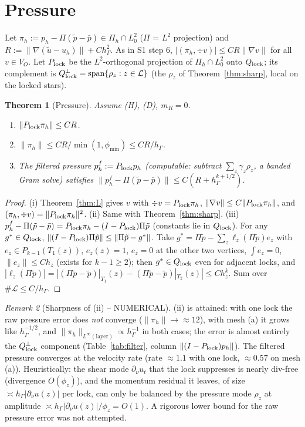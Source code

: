 \documentclass[11pt]{article}
\newtheorem{theorem}{Theorem}
\theoremstyle{remark}
\newtheorem{remark}[theorem]{Remark}
\newcommand{\hG}{h_\Gamma}
\newcommand{\VO}{V_O}
\newcommand{\Pih}{\Pi_h}
\newcommand{\Lk}{\mathcal L}
\newcommand{\dn}{\partial_\nu}
\newcommand{\norm}[1]{\|#1\|}
\newcommand{\Ql}{Q_{\rm lock}}
\begin{document}
\section{Pressure}\label{sec:p}
Let $\pi_h:=p_h-\Pi(\tilde p-\bar p)\in\Pih\cap L^2_0$ ($\Pi$ = $L^2$ projection) and
$R:=\norm{\nabla(\tilde u-u_h)}+C\hG^2$. As in S1 step 6, $|(\pi_h,\div v)|\le CR\norm{\nabla v}$ for all $v\in\VO$.
Let $P_{\rm lock}$ be the $L^2$-orthogonal projection of $\Pih\cap L^2_0$ onto $\Ql$; its complement is
$\Ql^\perp=\mathrm{span}\{\rho_z:z\in\Lk\}$ (the $\rho_z$ of Theorem~\ref{thm:sharp}, local on the locked stars).

\begin{theorem}[Pressure]\label{thm:P}
Assume (H), (D), $m_R=0$.
\begin{enumerate}
\item[(i)] $\norm{P_{\rm lock}\pi_h}\le CR$.
\item[(ii)] $\norm{\pi_h}\le CR/\min(1,\phi_{\min})\le CR/\hG$.
\item[(iii)] The \emph{filtered pressure} $p_h^f:=P_{\rm lock}p_h$ (computable: subtract $\sum_z\gamma_z\rho_z$, a banded
Gram solve) satisfies $\norm{p_h^f-\Pi(\tilde p-\bar p)}\le C(R+\hG^{k+1/2})$.
\end{enumerate}
\end{theorem}
\begin{proof}
(i) Theorem~\ref{thm:L} gives $v$ with $\div v=P_{\rm lock}\pi_h$, $\norm{\nabla v}\le C\norm{P_{\rm lock}\pi_h}$, and
$(\pi_h,\div v)=\norm{P_{\rm lock}\pi_h}^2$. (ii) Same with Theorem~\ref{thm:sharp}. (iii)
$p_h^f-\Pi(\tilde p-\bar p)=P_{\rm lock}\pi_h-(I-P_{\rm lock})\Pi\tilde p$ (constants lie in $\Ql$). For any $g^*\in\Ql$,
$\norm{(I-P_{\rm lock})\Pi\tilde p}\le\norm{\Pi\tilde p-g^*}$. Take $g^*=\Pi\tilde p-\sum_z\ell_z(\Pi\tilde p)e_z$ with
$e_z\in P_{k-1}(T_1(z))$, $e_z(z)=1$, $e_z=0$ at the other two vertices, $\int e_z=0$, $\norm{e_z}\le Ch_z$ (exists for
$k-1\ge2$); then $g^*\in\Ql$ even for adjacent locks, and $|\ell_z(\Pi\tilde p)|=|(\Pi\tilde p-\tilde p)|_{T_1}(z)-(\Pi\tilde p-\tilde p)|_{T_2}(z)|\le Ch_z^k$.
Sum over $\#\Lk\le C/\hG$.
\end{proof}

\begin{remark}[Sharpness of (ii) -- NUMERICAL]
(ii) is attained: with one lock the raw pressure error does \emph{not} converge ($\norm{\pi_h}\to\approx12$), with
mesh (a) it grows like $\hG^{-1/2}$, and $\norm{\pi_h}_{L^\infty(\text{layer})}\propto\hG^{-1}$ in both cases; the error
is almost entirely the $\Ql^\perp$ component (Table~\ref{tab:filter}, column $\norm{(I-P_{\rm lock})p_h}$). The
filtered pressure converges at the velocity rate (rate $\approx1.1$ with one lock, $\approx0.57$ on mesh (a)).
Heuristically: the shear mode $\dn u_t$ that the lock suppresses is nearly div-free (divergence $O(\phi_z)$), and the
momentum residual it leaves, of size $\asymp\hG|\dn u(z)|$ per lock, can only be balanced by the pressure mode
$\rho_z$ at amplitude $\asymp\hG|\dn u(z)|/\phi_z=O(1)$. A rigorous lower bound for the raw pressure error was not
attempted.
\end{remark}
\end{document}

